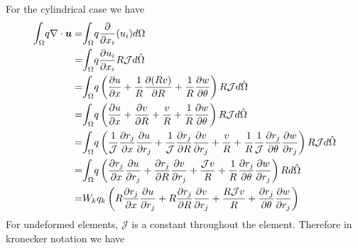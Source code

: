 \documentclass{kthreport}
\begin{document}
For the cylindrical case we have
\begin{eqnarray}
	\mathlarger\int_{\Omega} q\nabla\cdot \bm{u}  = & \mathlarger\int_{\Omega} q\dfrac{\partial }{\partial x_{i}}(u_{i}) d\Omega \nonumber \\
	= & \mathlarger\int_{\Omega} q\dfrac{\partial u_{i}}{\partial x_{i}} R \mathcal{J} d\hat{\Omega} \nonumber \\
	= & \mathlarger\int_{\Omega} q\left(\dfrac{\partial u}{\partial x} + \dfrac{1}{R}\dfrac{\partial (Rv)}{\partial R} + \dfrac{1}{R}\dfrac{\partial w}{\partial \theta} \right) R \mathcal{J} d\hat{\Omega} \nonumber \\
	= & \mathlarger\int_{\Omega} q\left(\dfrac{\partial u}{\partial x} + \dfrac{\partial v}{\partial R} + \dfrac{v}{R}+ \dfrac{1}{R}\dfrac{\partial w}{\partial \theta} \right) R \mathcal{J} d\hat{\Omega} \nonumber \\
	= & \mathlarger\int_{\Omega} q\left(\dfrac{1}{\mathcal{J}}\dfrac{\partial r_{j}}{\partial x}\dfrac{\partial u}{\partial r_{j}} + \dfrac{1}{\mathcal{J}}\dfrac{\partial r_{j}}{\partial R}\dfrac{\partial v}{\partial r_{j}} + \dfrac{v}{R} + \dfrac{1}{R}\dfrac{1}{\mathcal{J}}\dfrac{\partial r_{j}}{\partial \theta}\dfrac{\partial w}{\partial r_{j}} \right) R \mathcal{J} d\hat{\Omega} \nonumber \\
	= & \mathlarger\int_{\Omega} q\left(\dfrac{\partial r_{j}}{\partial x}\dfrac{\partial u}{\partial r_{j}} + \dfrac{\partial r_{j}}{\partial R}\dfrac{\partial v}{\partial r_{j}} + \dfrac{\mathcal{J}v}{R} + \dfrac{1}{R}\dfrac{\partial r_{j}}{\partial \theta}\dfrac{\partial w}{\partial r_{j}} \right) R  d\hat{\Omega} \nonumber \\	
	= &  W_{k}q_{k}\left(R\dfrac{\partial r_{j}}{\partial x}\dfrac{\partial u}{\partial r_{j}} + R\dfrac{\partial r_{j}}{\partial R}\dfrac{\partial v}{\partial r_{j}} + \dfrac{R\mathcal{J}v}{R} + \dfrac{\partial r_{j}}{\partial \theta}\dfrac{\partial w}{\partial r_{j}} \right) 
\end{eqnarray}
For undeformed elements, $\mathcal{J}$ is a constant throughout the element. Therefore in kronecker notation we have
\end{document}
